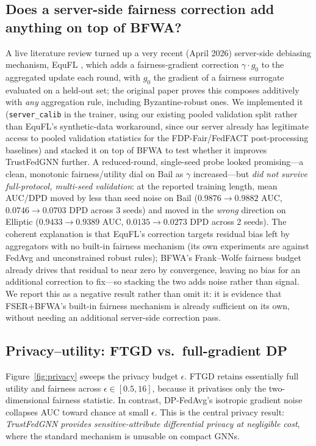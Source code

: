 \subsection{Does a server-side fairness correction add anything on top of BFWA?}
\label{sec:exp-equfl}
A live literature review turned up a very recent (April 2026) server-side
debiasing mechanism, EquFL \cite{yu2026equfl}, which adds a fairness-gradient
correction $\gamma\cdot g_0$ to the aggregated update each round, with $g_0$
the gradient of a fairness surrogate evaluated on a held-out set; the original
paper proves this composes additively with \emph{any} aggregation rule,
including Byzantine-robust ones. We implemented it (\texttt{server\_calib} in
the trainer, using our existing pooled validation split rather than EquFL's
synthetic-data workaround, since our server already has legitimate access to
pooled validation statistics for the FDP-Fair/FedFACT post-processing
baselines) and stacked it on top of BFWA to test whether it improves
TrustFedGNN further. A reduced-round, single-seed probe looked promising---a
clean, monotonic fairness/utility dial on Bail as $\gamma$ increased---but
\emph{did not survive full-protocol, multi-seed validation}: at the reported
training length, mean AUC/DPD moved by less than seed noise on Bail
($0.9876{\to}0.9882$ AUC, $0.0746{\to}0.0703$ DPD across 3 seeds) and moved in
the \emph{wrong} direction on Elliptic ($0.9433{\to}0.9389$ AUC,
$0.0135{\to}0.0273$ DPD across 2 seeds). The coherent explanation is that
EquFL's correction targets residual bias left by aggregators with no built-in
fairness mechanism (its own experiments are against FedAvg and unconstrained
robust rules); BFWA's Frank--Wolfe fairness budget already drives that
residual to near zero by convergence, leaving no bias for an additional
correction to fix---so stacking the two adds noise rather than signal. We
report this as a negative result rather than omit it: it is evidence that
FSER+BFWA's built-in fairness mechanism is already sufficient on its own,
without needing an additional server-side correction pass.

\subsection{Privacy--utility: FTGD vs.\ full-gradient DP}
\label{sec:exp-privacy}
Figure~\ref{fig:privacy} sweeps the privacy budget $\epsilon$. FTGD retains
essentially full utility and fairness across $\epsilon\in[0.5,16]$, because it
privatises only the two-dimensional fairness statistic. In contrast, DP-FedAvg's
isotropic gradient noise collapses AUC toward chance at small $\epsilon$. This is
the central privacy result: \emph{TrustFedGNN provides sensitive-attribute
differential privacy at negligible cost}, where the standard mechanism is
unusable on compact GNNs.


